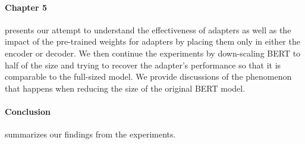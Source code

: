 \paragraph{Chapter 5} presents our attempt to understand the effectiveness of adapters as well as the impact of the pre-trained weights for adapters by placing them only in either the encoder or decoder. We then continue the experiments by down-scaling BERT to half of the size and trying to recover the adapter's performance so that it is comparable to the full-sized model. We provide discussions of the phenomenon that happens when reducing the size of the original BERT model.

\paragraph{Conclusion} summarizes our findings from the experiments.